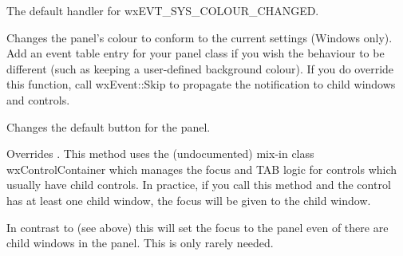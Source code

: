 
\label{wxpanelonsyscolourchanged}


The default handler for wxEVT\_SYS\_COLOUR\_CHANGED.




Changes the panel's colour to conform to the current settings (Windows only).
Add an event table entry for your panel class if you wish the behaviour
to be different (such as keeping a user-defined
background colour). If you do override this function, call wxEvent::Skip to
propagate the notification to child windows and controls.




\label{wxpanelsetdefaultitem}


Changes the default button for the panel.




\label{wxpanelsetfocus}


Overrides . This method
uses the (undocumented) mix-in class wxControlContainer which manages
the focus and TAB logic for controls which usually have child controls.
In practice, if you call this method and the control has at least
one child window, the focus will be given to the child window.




\label{wxpanelsetfocusignoringchildren}


In contrast to  (see above)
this will set the focus to the panel even of there are child windows
in the panel. This is only rarely needed.



